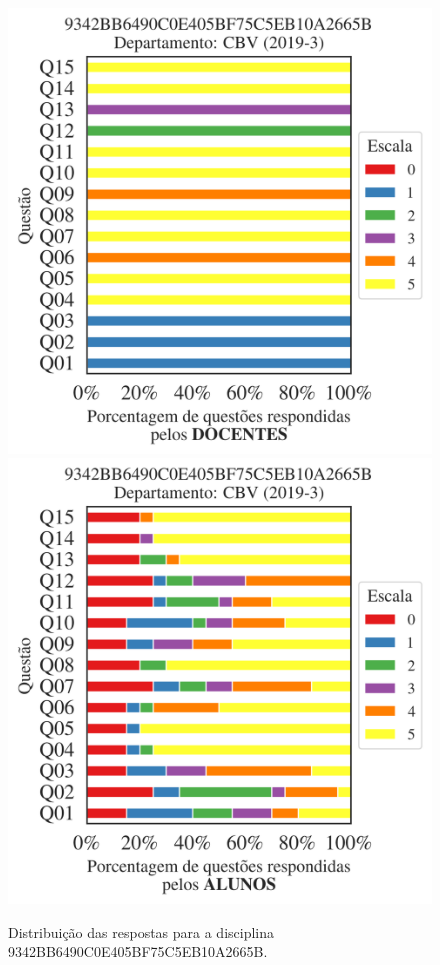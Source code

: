 \documentclass[a4paper,10pt]{article}
\begin{document}
\begin{figure}[h]
\centering
\includegraphics[width=0.485\linewidth]{analise_disciplina_departamento_CBV_9342BB6490C0E405BF75C5EB10A2665B_docentes.png}
\includegraphics[width=0.485\linewidth]{analise_disciplina_departamento_CBV_9342BB6490C0E405BF75C5EB10A2665B_alunos.png}
\caption{\label{fig:analise_geral_departamento}                Distribuição das respostas para a disciplina 9342BB6490C0E405BF75C5EB10A2665B. }
\end{figure}
\end{document}
